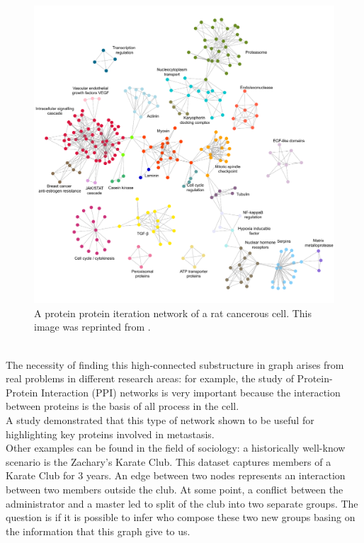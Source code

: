 \begin{figure}[h]
	\centering
	\includegraphics[width=1\linewidth]{0-resources/ppi}
	\caption{A protein protein iteration network of a rat cancerous cell. This image was reprinted from \cite{metastasis}.}
	\label{fig:ppi}
\end{figure}\\
The necessity of finding this high-connected substructure in graph arises from real problems in different research areas: for example, the study of Protein-Protein Interaction (PPI) networks is very important because the interaction between proteins is the basis of all process in the cell.\\ A study demonstrated that this type of network shown to be useful for highlighting key proteins involved in metastasis. \cite{metastasis} \\
Other examples can be found in the field of sociology: a historically well-know scenario is the Zachary's Karate Club. This dataset captures members of a Karate Club for 3 years.\cite{Zac77} An edge between two nodes represents an interaction between two members outside the club. At some point, a conflict between the administrator and a master led to split of the club into two separate groups. The question is if it is possible to infer who compose these two new groups basing on the information that this graph give to us. 
